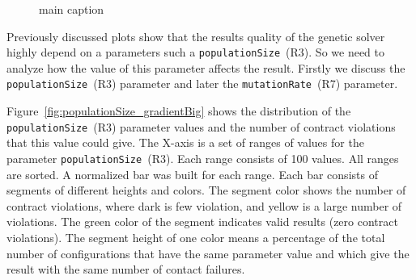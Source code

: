 \begin{figure}
	
	
	\caption{main caption}
	\label{fig:populationSize_gradient}
\end{figure}

Previously discussed plots show that the results quality of the genetic solver highly depend on a parameters such a \texttt{populationSize}~(R3). So we need to analyze how the value of this parameter affects the result. Firstly we discuss the \texttt{populationSize}~(R3) parameter and later the \texttt{mutationRate}~(R7) parameter.

Figure~\ref{fig:populationSize_gradientBig} shows the distribution of the \texttt{populationSize}~(R3) parameter values and the number of contract violations that this value could give. The X-axis is a set of ranges of values for the parameter \texttt{populationSize}~(R3). Each range consists of 100 values. All ranges are sorted. A normalized bar was built for each range. Each bar consists of segments of different heights and colors. The segment color shows the number of contract violations, where dark is few violation, and yellow is a large number of violations. The green color of the segment indicates valid results (zero contract violations). The segment height of one color means a percentage of the total number of configurations that have the same parameter value and which give the result with the same number of contact failures.

